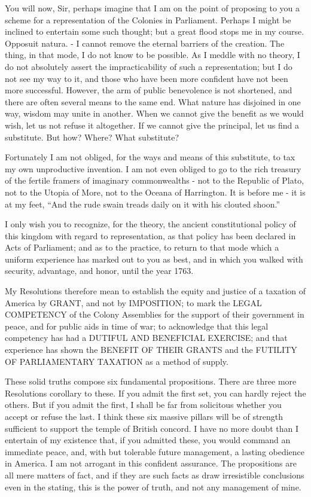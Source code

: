 You will now, Sir, perhaps imagine that I am on the point of proposing to you a scheme for a representation of the Colonies in Parliament. Perhaps I might be inclined to entertain some such thought; but a great flood stops me in my course. Opposuit natura. - I cannot remove the eternal barriers of the creation. The thing, in that mode, I do not know to be possible. As I meddle with no theory, I do not absolutely assert the impracticability of such a representation; but I do not see my way to it, and those who have been more confident have not been more successful. However, the arm of public benevolence is not shortened, and there are often several means to the same end. What nature has disjoined in one way, wisdom may unite in another. When we cannot give the benefit as we would wish, let us not refuse it altogether. If we cannot give the principal, let us find a substitute. But how? Where? What substitute?\par

Fortunately I am not obliged, for the ways and means of this substitute, to tax my own unproductive invention. I am not even obliged to go to the rich treasury of the fertile framers of imaginary commonwealths - not to the Republic of Plato, not to the Utopia of More, not to the Oceana of Harrington. It is before me - it is at my feet, “And the rude swain treads daily on it with his clouted shoon.”\par

I only wish you to recognize, for the theory, the ancient constitutional policy of this kingdom with regard to representation, as that policy has been declared in Acts of Parliament; and as to the practice, to return to that mode which a uniform experience has marked out to you as best, and in which you walked with security, advantage, and honor, until the year 1763.\par

My Resolutions therefore mean to establish the equity and justice of a taxation of America by GRANT, and not by IMPOSITION; to mark the LEGAL COMPETENCY of the Colony Assemblies for the support of their government in peace, and for public aids in time of war; to acknowledge that this legal competency has had a DUTIFUL AND BENEFICIAL EXERCISE; and that experience has shown the BENEFIT OF THEIR GRANTS and the FUTILITY OF PARLIAMENTARY TAXATION as a method of supply.\par

These solid truths compose six fundamental propositions. There are three more Resolutions corollary to these. If you admit the first set, you can hardly reject the others. But if you admit the first, I shall be far from solicitous whether you accept or refuse the last. I think these six massive pillars will be of strength sufficient to support the temple of British concord. I have no more doubt than I entertain of my existence that, if you admitted these, you would command an immediate peace, and, with but tolerable future management, a lasting obedience in America. I am not arrogant in this confident assurance. The propositions are all mere matters of fact, and if they are such facts as draw irresistible conclusions even in the stating, this is the power of truth, and not any management of mine.\par

